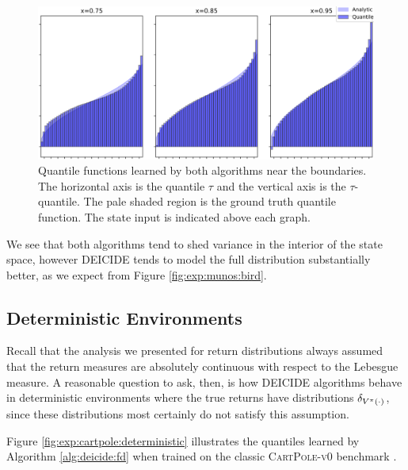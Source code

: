 \begin{figure}[h]
\begin{minipage}[t]{0.495\linewidth}
  \end{minipage}%
  \begin{minipage}[t]{0.495\linewidth}
    \centering
    \includegraphics[scale=\munosscanscalect]{results/ct51-munos-scan-right}
  \end{minipage}
  \caption[Estimates of the return measures near the boundaries]{%
    Quantile functions learned by both algorithms near the
    boundaries. The horizontal axis is the quantile $\tau$ and the
    vertical axis is the $\tau$-quantile. The pale shaded region is
    the ground truth quantile function. The state input is indicated
    above each graph.
  }
  \label{fig:exp:munos:bounds}
\end{figure}

We see that both algorithms tend to shed variance in the interior of
the state space, however DEICIDE tends to model the full distribution
substantially better, as we expect from Figure \ref{fig:exp:munos:bird}.

\subsection{Deterministic Environments}
Recall that the analysis we presented for return distributions always
assumed that the return measures are absolutely continuous with
respect to the Lebesgue measure. A reasonable question to ask, then,
is how DEICIDE algorithms behave in deterministic environments where
the true returns have distributions $\delta_{V^\pi(\cdot)}$, since
these distributions most certainly do not satisfy this assumption.

Figure \ref{fig:exp:cartpole:deterministic} illustrates the quantiles
learned by Algorithm \ref{alg:deicide:fd} when trained on the classic
\textsc{CartPole-v0} benchmark \citep{brockman2016openai}.

